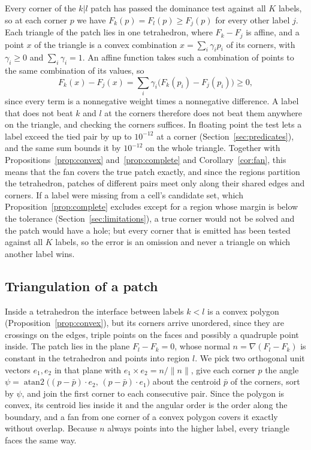 \documentclass[11pt]{article}
\theoremstyle{definition}
\newcommand{\interp}{F}
\begin{document}
Every corner of the $k|l$ patch has passed the dominance test against all $K$
labels, so at each corner $p$ we have $\interp_k(p) = \interp_l(p) \ge
\interp_j(p)$ for every other label $j$. Each triangle of the patch lies in
one tetrahedron, where $\interp_k - \interp_j$ is affine, and a point $x$ of
the triangle is a convex combination $x = \sum_i \gamma_i p_i$ of its corners, with
$\gamma_i \ge 0$ and $\sum_i \gamma_i = 1$. An affine function takes such a combination
of points to the same combination of its values, so
\[
\interp_k(x) - \interp_j(x) = \sum_i \gamma_i \big(\interp_k(p_i) - \interp_j(p_i)\big) \ge 0,
\]
since every term is a nonnegative weight times a nonnegative difference. A
label that does not beat $k$ and $l$ at the corners therefore does not beat
them anywhere on the triangle, and checking the corners suffices. In floating
point the test lets a label exceed the tied pair by up to $10^{-12}$ at a
corner (Section~\ref{sec:predicates}), and the same sum bounds it by $10^{-12}$
on the whole triangle. Together with Propositions~\ref{prop:convex}
and~\ref{prop:complete} and Corollary~\ref{cor:fan}, this means that the fan
covers the true patch exactly, and since the regions partition the
tetrahedron, patches of different pairs meet only along their shared edges
and corners. If a label were missing from a cell's candidate set, which
Proposition~\ref{prop:complete} excludes except for a region whose margin is
below the tolerance (Section~\ref{sec:limitations}), a true corner would not
be solved and the patch would have a hole; but every corner that is emitted
has been tested against all $K$ labels, so the error is an omission and never
a triangle on which another label wins.

\subsection{Triangulation of a patch}

Inside a tetrahedron the interface between labels $k<l$ is a convex polygon
(Proposition~\ref{prop:convex}), but its corners arrive unordered, since they
are crossings on the edges, triple points on the faces and possibly a
quadruple point inside. The patch lies in the
plane $\interp_l - \interp_k = 0$, whose normal $n = \nabla(\interp_l -
\interp_k)$ is constant in the tetrahedron and points into region $l$. We pick
two orthogonal unit vectors $e_1, e_2$ in that plane with $e_1 \times e_2 = n/\lVert n\rVert$, give each
corner $p$ the angle $\psi = \operatorname{atan2}\big((p-\bar p)\cdot e_2,\,
(p-\bar p)\cdot e_1\big)$ about the centroid $\bar p$ of the corners, sort by $\psi$,
and join the first corner to each consecutive pair. Since the polygon is
convex, its centroid lies inside it and the angular order is the order along
the boundary, and a fan from one corner of a convex polygon covers it exactly
without overlap. Because $n$ always points into the higher label, every
triangle faces the same way.
\end{document}
